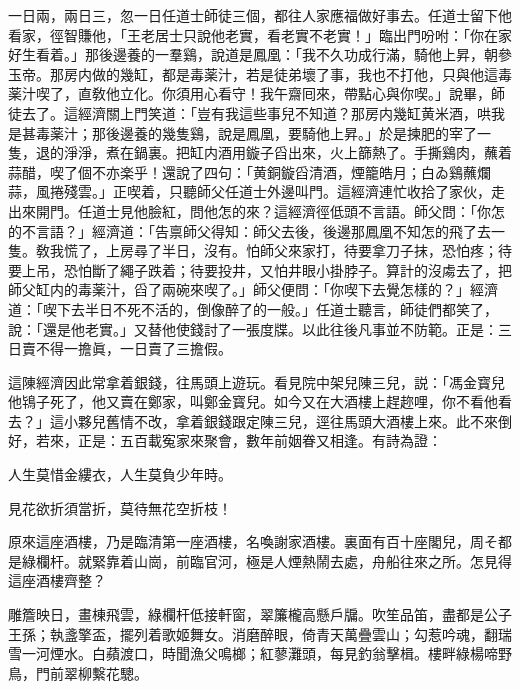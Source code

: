 一日兩，兩日三，忽一日任道士師徒三個，都往人家應福做好事去。任道士留下他看家，徑智賺他，「王老居士只說他老實，看老實不老實！」臨出門吩咐：「你在家好生看着。」那後邊養的一羣鷄，說道是鳳凰：「我不久功成行滿，騎他上昇，朝參玉帝。那房内做的幾缸，都是毒薬汁，若是徒弟壞了事，我也不打他，只與他這毒薬汁喫了，直敎他立化。你須用心看守！我午齋囘來，帶點心與你喫。」說畢，師徒去了。這經濟關上門笑道：「豈有我這些事兒不知道？那房内幾缸黄米酒，哄我是甚毒薬汁；那後邊養的幾隻鷄，說是鳳凰，要騎他上昇。」於是揀肥的宰了一隻，退的淨淨，煮在鍋裏。把缸内酒用鏇子舀出來，火上篩熱了。手撕鷄肉，蘸着蒜醋，喫了個不亦楽乎！還說了四句：「黄銅鏇舀清酒，煙籠皓月；白ゐ鷄蘸爛蒜，風捲殘雲。」正喫着，只聽師父任道士外邊叫門。這經濟連忙收拾了家伙，走出來開門。任道士見他臉紅，問他怎的來？這經濟徑低頭不言語。師父問：「你怎的不言語？」經濟道：「告禀師父得知：師父去後，後邊那鳳凰不知怎的飛了去一隻。敎我慌了，上房尋了半日，沒有。怕師父來家打，待要拿刀子抹，恐怕疼；待要上吊，恐怕斷了繩子跌着；待要投井，又怕井眼小掛脖子。算計的沒䖏去了，把師父缸内的毒薬汁，舀了兩碗來喫了。」師父便問：「你喫下去覺怎樣的？」經濟道：「喫下去半日不死不活的，倒像醉了的一般。」任道士聽言，師徒們都笑了，說：「還是他老實。」又替他使錢討了一張度牒。以此往後凡事並不防範。正是：三日賣不得一擔眞，一日賣了三擔假。

這陳經濟因此常拿着銀錢，往馬頭上遊玩。看見院中架兒陳三兒，説：「馮金寳兒他鴇子死了，他又賣在鄭家，叫鄭金寳兒。如今又在大酒樓上趕趂哩，你不看他看去？」這小夥兒舊情不改，拿着銀錢跟定陳三兒，逕往馬頭大酒樓上來。此不來倒好，若來，正是：五百載寃家來聚會，數年前姻眷又相逢。有詩為證：

\begin{myquote}
人生莫惜金縷衣，人生莫負少年時。

見花欲折須當折，莫待無花空折枝！
\end{myquote}

原來這座酒樓，乃是臨清第一座酒樓，名喚謝家酒樓。裏面有百十座閣兒，周そ都是綠欄杆。就緊靠着山崗，前臨官河，極是人煙熱鬧去處，舟船往來之所。怎見得這座酒樓齊整？

\begin{myquote}
雕簷映日，畫棟飛雲，綠欄杆低接軒窗，翠簾櫳高懸戶牖。吹笙品笛，盡都是公子王孫；執盞擎盃，擺列着歌姬舞女。消磨醉眼，倚青天萬疊雲山；勾惹吟魂，翻瑞雪一河煙水。白蘋渡口，時聞漁父鳴榔；紅蓼灘頭，每見釣翁擊楫。樓畔綠楊啼野鳥，門前翠柳繫花驄。
\end{myquote}

